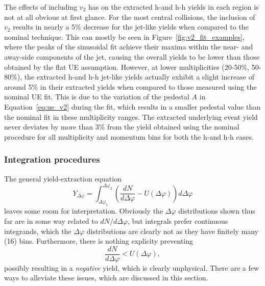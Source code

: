 The effects of including $v_{2}$ has on the extracted h-\lmb and h-h yields in each region is not at all obvious at first glance. For the most central collisions, the inclusion of $v_{2}$ results in nearly a 5\% decrease for the jet-like yields when compared to the nominal technique. This can mostly be seen in Figure~\ref{fig:v2_fit_examples}, where the peaks of the sinusoidal fit achieve their maxima within the near- and away-side components of the jet, causing the overall yields to be lower than those obtained by the flat UE assumption. However, at lower multiplicities (20-50\%, 50-80\%), the extracted h-\lmb and h-h jet-like yields actually exhibit a slight increase of around 5\% in their extracted yields when compared to those measured using the nominal UE fit. This is due to the variation of the pedestal $A$ in Equation~\ref{eq:ue_v2} during the fit, which results in a smaller pedestal value than the nominal fit in these multiplicity ranges. The extracted underlying event yield never deviates by more than 3\% from the yield obtained using the nominal procedure for all multiplicity and momentum bins for both the h-\lmb and h-h cases.

\subsubsection{Integration procedures}
\label{sec:integration_procedures}

The general yield-extraction equation
%
\begin{equation}
    \label{eq:general_yield}
    Y_{\Delta\varphi} = \int_{\Delta\varphi_1}^{\Delta\varphi_2} (\frac{dN}{d\Delta\varphi}- U(\Delta\varphi))d\Delta\varphi
\end{equation}
%
leaves some room for interpretation. Obviously the $\Delta\varphi$ distributions shown thus far are in some way related to $dN/d\Delta\varphi$, but integrals prefer continuous integrands, which the $\Delta\varphi$ distributions are clearly not as they have finitely many (16) bins. Furthermore, there is nothing explicity preventing 
%
\begin{equation}
    \frac{dN}{d\Delta\varphi} < U(\Delta\varphi),
\end{equation}
%
possibly resulting in a \textit{negative} yield, which is clearly unphysical. There are a few ways to alleviate these issues, which are discussed in this section.

